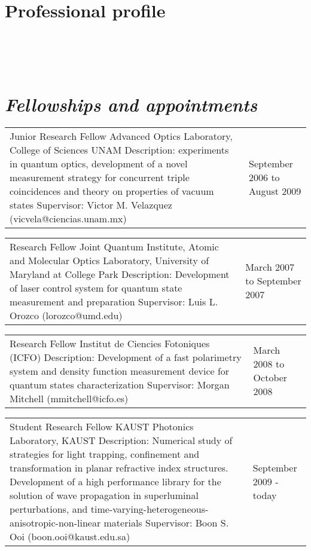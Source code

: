 \documentclass[margin,10pt]{res}
\newcommand{\subs}[1]{\normalfont\emph{\color{Black!90}#1}}
\newcommand{\secs}[1]{\normalsize{\section{\subs{#1}}}}
\begin{document}
\section{Professional profile}

\secs{~~}
\secs{Fellowships and appointments}
\begin{tabular}{p{3.8in} l}
Junior Research Fellow \newline Advanced Optics Laboratory, College of Sciences UNAM \newline Description: experiments in quantum optics, development of a novel measurement strategy for concurrent triple coincidences and theory on properties of vacuum states \newline Supervisor: Victor M. Velazquez (vicvela@ciencias.unam.mx) \newline ~ & September 2006 to August 2009 
\end{tabular}

\begin{tabular}{p{3.8in} l}
Research Fellow \newline Joint Quantum Institute, Atomic and Molecular Optics Laboratory, University of Maryland at College Park \newline Description: Development of laser control system for quantum state measurement and preparation \newline Supervisor: Luis L. Orozco (lorozco@umd.edu) \newline & March 2007 to September 2007 \end{tabular}

\begin{tabular}{p{3.8in} l}
Research Fellow \newline Institut de Ciencies Fotoniques (ICFO) \newline Description: Development of a fast polarimetry system and density function measurement device for quantum states characterization \newline Supervisor: Morgan Mitchell (mmitchell@icfo.es) \newline & March 2008 to October 2008
\end{tabular}

\begin{tabular}{p{3.8in} l}
Student Research Fellow \newline KAUST Photonics Laboratory, KAUST \newline Description: Numerical study of strategies for light trapping, confinement and transformation in planar refractive index structures. Development of a high performance library for the solution of wave propagation in superluminal perturbations, and time-varying-heterogeneous-anisotropic-non-linear materials \newline Supervisor: Boon S. Ooi (boon.ooi@kaust.edu.sa) \newline & September 2009 - today 
\end{tabular}
\end{document}
